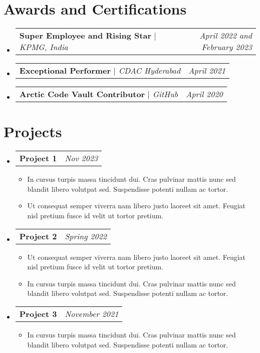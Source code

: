 \documentclass[letterpaper,10pt]{article}
\makeatletter
\newcommand{\subheadingtitlevspace}{
\vspace{-3pt}
}
\newcommand{\resumeItem}[1]{
  \item{
    {#1 \vspace{-4pt}}
  }
}
\newcommand{\titleItem}[1]{
  \textbf{#1}
}
\newcommand{\resumeProjectHeading}[2]{
    \item
    \begin{tabular*}{0.97\textwidth}{l@{\extracolsep{\fill}}r}
      #1 & \textit{ #2} \\
    \end{tabular*}\vspace{-9pt}
}
\newcommand{\resumeSubHeadingListStart}{\subheadingtitlevspace\begin{itemize}[leftmargin=0.15in, label={}]}
\newcommand{\resumeSubHeadingListEnd}{\end{itemize}}
\newcommand{\resumeItemListStart}{
\begin{itemize}}
\newcommand{\resumeItemListEnd}{
\end{itemize}\vspace{-8pt}}
\makeatother
\begin{document}
\section{Awards and Certifications}
 \vspace{-1pt}
    \resumeSubHeadingListStart
      \resumeProjectHeading
          {\titleItem{Super Employee and Rising Star} \emph{ $|$ KPMG, India}}{April 2022 and February 2023}
      \resumeProjectHeading
          {\titleItem{Exceptional Performer} \emph{ $|$ CDAC Hyderabad}}{April 2021}
      \resumeProjectHeading
          {\titleItem{Arctic Code Vault Contributor} \emph{$|$ GitHub}}{April 2020}
    \resumeSubHeadingListEnd





 \section{Projects}    
     \resumeSubHeadingListStart
        \resumeProjectHeading
           {\titleItem{Project 1}}{Nov 2023}
            \resumeItemListStart
            \resumeItem{In cursus turpis massa tincidunt dui. Cras pulvinar mattis nunc sed blandit libero volutpat sed. Suspendisse potenti nullam ac tortor. }
            \resumeItem{Ut consequat semper viverra nam libero justo laoreet sit amet. Feugiat nisl pretium fusce id velit ut tortor pretium.}
           \resumeItemListEnd
       \resumeProjectHeading
           {\titleItem{Project 2}}{Spring 2022}
            \resumeItemListStart
            \resumeItem{Ut consequat semper viverra nam libero justo laoreet sit amet. Feugiat nisl pretium fusce id velit ut tortor pretium.} 
            \resumeItem{In cursus turpis massa tincidunt dui. Cras pulvinar mattis nunc sed blandit libero volutpat sed. Suspendisse potenti nullam ac tortor. }
           \resumeItemListEnd
       \resumeProjectHeading
           {\titleItem{Project 3}}{November 2021}
            \resumeItemListStart
            \resumeItem{In cursus turpis massa tincidunt dui. Cras pulvinar mattis nunc sed blandit libero volutpat sed. Suspendisse potenti nullam ac tortor. }
           \resumeItemListEnd
     \resumeSubHeadingListEnd

\end{document}
